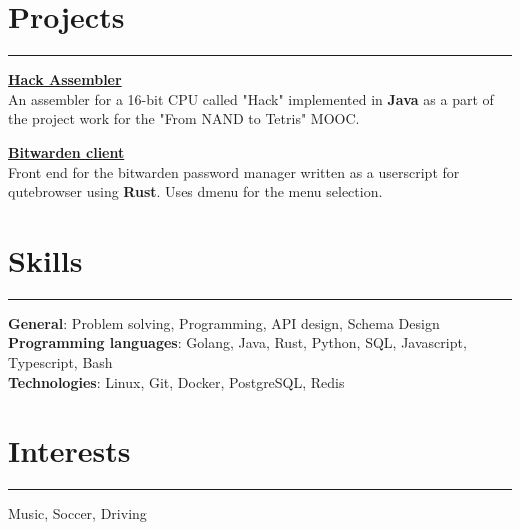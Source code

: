 \documentclass[11pt]{article}
\begin{document}
\vspace{-0.5\baselineskip}
\section*{Projects}
\hrule
\href{https://github.com/narayanan-gokul/hack-assembler}{\textbf{Hack Assembler}} \\
An assembler for a 16-bit CPU called "Hack" implemented in \textbf{Java} as a part of the
project work for the "From NAND to Tetris" MOOC.

\href{https://github.com/narayanan-gokul/qute_userscript}{\textbf{Bitwarden client}} \\
Front end for the bitwarden password manager written as a userscript for 
qutebrowser using \textbf{Rust}. Uses dmenu for the menu selection.

\vspace{-0.5\baselineskip}
\section*{Skills}
\hrule
\textbf{General}: Problem solving, Programming, API design, Schema Design \\
\textbf{Programming languages}: Golang, Java, Rust, Python, SQL, Javascript,
Typescript, Bash \\
\textbf{Technologies}: Linux, Git, Docker, PostgreSQL, Redis

\vspace{-0.5\baselineskip}
\section*{Interests}
\hrule
Music, Soccer, Driving
\end{document}
